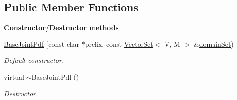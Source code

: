 \subsection*{Public Member Functions}
\begin{Indent}{\bf Constructor/\-Destructor methods}\par
\begin{DoxyCompactItemize}
\item 
\hyperlink{class_q_u_e_s_o_1_1_base_joint_pdf_ae1f0870366a17d71e05a2f84ec49e06e}{Base\-Joint\-Pdf} (const char $\ast$prefix, const \hyperlink{class_q_u_e_s_o_1_1_vector_set}{Vector\-Set}$<$ V, M $>$ \&\hyperlink{class_q_u_e_s_o_1_1_base_scalar_function_ad0937628825249dd36ded3ce0c7959ac}{domain\-Set})
\begin{DoxyCompactList}\small\item\em Default constructor. \end{DoxyCompactList}\item 
virtual \hyperlink{class_q_u_e_s_o_1_1_base_joint_pdf_a9f41f5dc30ddfd59e149c3a748898553}{$\sim$\-Base\-Joint\-Pdf} ()
\begin{DoxyCompactList}\small\item\em Destructor. \end{DoxyCompactList}\end{DoxyCompactItemize}
\end{Indent}
